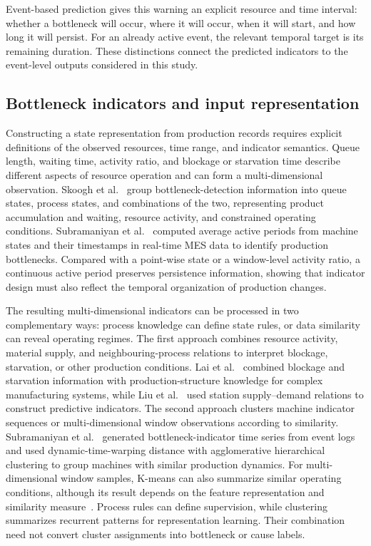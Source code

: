 \documentclass[a4paper,fleqn]{cas-dc}
\begin{document}
Event-based prediction gives this warning an explicit resource and time interval: whether a bottleneck will occur, where it will occur, when it will start, and how long it will persist. For an already active event, the relevant temporal target is its remaining duration. These distinctions connect the predicted indicators to the event-level outputs considered in this study.

\subsection{Bottleneck indicators and input representation}

Constructing a state representation from production records requires explicit definitions of the observed resources, time range, and indicator semantics. Queue length, waiting time, activity ratio, and blockage or starvation time describe different aspects of resource operation and can form a multi-dimensional observation. Skoogh et al.~\cite{subramaniyan2023throughput} group bottleneck-detection information into queue states, process states, and combinations of the two, representing product accumulation and waiting, resource activity, and constrained operating conditions. Subramaniyan et al.~\cite{subramaniyan2016realtime} computed average active periods from machine states and their timestamps in real-time MES data to identify production bottlenecks. Compared with a point-wise state or a window-level activity ratio, a continuous active period preserves persistence information, showing that indicator design must also reflect the temporal organization of production changes.

The resulting multi-dimensional indicators can be processed in two complementary ways: process knowledge can define state rules, or data similarity can reveal operating regimes. The first approach combines resource activity, material supply, and neighbouring-process relations to interpret blockage, starvation, or other production conditions. Lai et al.~\cite{lai2021data} combined blockage and starvation information with production-structure knowledge for complex manufacturing systems, while Liu et al.~\cite{liu2023lstmdam} used station supply--demand relations to construct predictive indicators. The second approach clusters machine indicator sequences or multi-dimensional window observations according to similarity. Subramaniyan et al.~\cite{subramaniyan2020clustering} generated bottleneck-indicator time series from event logs and used dynamic-time-warping distance with agglomerative hierarchical clustering to group machines with similar production dynamics. For multi-dimensional window samples, K-means can also summarize similar operating conditions, although its result depends on the feature representation and similarity measure~\cite{jain2010clustering}. Process rules can define supervision, while clustering summarizes recurrent patterns for representation learning. Their combination need not convert cluster assignments into bottleneck or cause labels.
\end{document}
